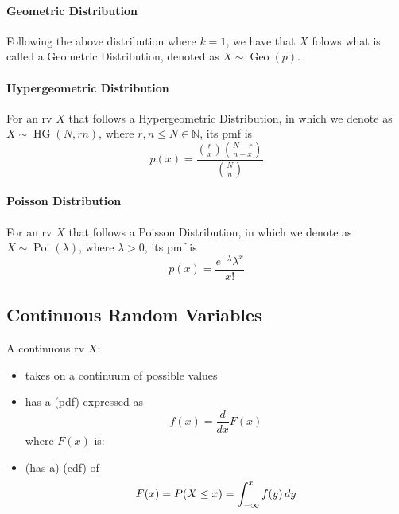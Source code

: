 \documentclass[notoc,notitlepage]{tufte-book}
\DeclareMathOperator{\Geo}{Geo }
\DeclareMathOperator{\Poi}{Poi }
\DeclareMathOperator{\HG}{HG }
\begin{document}
\paragraph{Geometric Distribution} Following the above distribution where $k = 1$, we have that $X$ folows what is called a Geometric Distribution, denoted as $X \sim \Geo(p)$.

\paragraph{Hypergeometric Distribution} For an rv $X$ that follows a Hypergeometric Distribution, in which we denote as $X \sim \HG(N, r n)$, where $r, n \leq N \in \mathbb{N}$, its pmf is
\begin{equation*}
  p(x) = \frac{\binom{r}{x} \binom{N - r}{n - x}}{\binom{N}{n}}
\end{equation*}

\paragraph{Poisson Distribution} For an rv $X$ that follows a Poisson Distribution, in which we denote as $X \sim \Poi(\lambda)$, where $\lambda > 0$, its pmf is
\begin{equation*}
  p(x) = \frac{e^{- \lambda} \lambda^{x}}{x!}
\end{equation*}


\subsection{Continuous Random Variables}%
\label{sub:continuous_random_variables}


A continuous rv $X$:
\begin{itemize}
  \item takes on a continuum of possible values
  \item has a  (pdf) expressed as
    \begin{equation*}
      f(x) = \frac{d}{dx} F(x)
    \end{equation*}
    where $F(x)$ is:
  \item (has a)  (cdf) of
    \begin{equation*}
      F(x) = P(X \leq x) = \int_{-\infty}^{x} f(y) \mathop{}\!d{y}
    \end{equation*}
\end{itemize}
\end{document}
